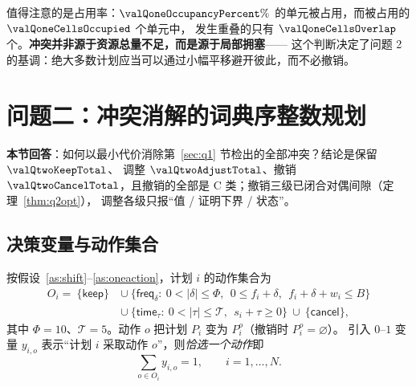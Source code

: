 

值得注意的是占用率：$\valQoneOccupancyPercent\%$ 的单元被占用，而被占用的 $\valQoneCellsOccupied$ 个单元中，
发生重叠的只有 $\valQoneCellsOverlap$ 个。\textbf{冲突并非源于资源总量不足，而是源于局部拥塞}——
这个判断决定了问题 2 的基调：绝大多数计划应当可以通过小幅平移避开彼此，而不必撤销。

\section{问题二：冲突消解的词典序整数规划}
\label{sec:q2}

\noindent\textbf{本节回答}：如何以最小代价消除第~\ref{sec:q1} 节检出的全部冲突？结论是保留 $\valQtwoKeepTotal$、
调整 $\valQtwoAdjustTotal$、撤销 $\valQtwoCancelTotal$，且撤销的全部是 C 类；撤销三级已闭合对偶间隙（定理~\ref{thm:q2opt}），
调整各级只报“值 / 证明下界 / 状态”。

\subsection{决策变量与动作集合}

按假设~\ref{as:shift}--\ref{as:oneaction}，计划 $i$ 的动作集合为
\begin{equation}\label{eq:options}
  \begin{aligned}
    O_i=\ \{\textsf{keep}\}\ &\cup\ \{\textsf{freq}_\delta:\ 0<|\delta|\le\Phi,\ \ 0\le f_i+\delta,\ \ f_i+\delta+w_i\le B\}\\
    &\cup\ \{\textsf{time}_\tau:\ 0<|\tau|\le\mathcal{T},\ \ s_i+\tau\ge 0\}\ \cup\ \{\textsf{cancel}\},
  \end{aligned}
\end{equation}
其中 $\Phi=10$、$\mathcal{T}=5$。动作 $o$ 把计划 $P_i$ 变为 $P_i^{o}$（撤销时 $P_i^{o}=\varnothing$）。
引入 $0$--$1$ 变量 $y_{i,o}$ 表示“计划 $i$ 采取动作 $o$”，则\emph{恰选一个动作}即
\begin{equation}\label{eq:exactlyone}
  \sum_{o\in O_i} y_{i,o}=1,\qquad i=1,\dots,N .
\end{equation}

